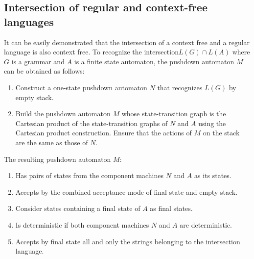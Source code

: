 \subsection{Intersection of regular and context-free languages}
It can be easily demonstrated that the intersection of a context free and a regular language is also context free.
To recognize the intersection$L(G) \cap L(A)$ where $G$ is a grammar and $A$ is a finite state automaton, the pushdown automaton $M$ can be obtained as follows: 
\begin{enumerate}
    \item Construct a one-state pushdown automaton $N$ that recognizes $L (G)$ by empty stack. 
    \item Build the pushdown automaton $M$ whose state-transition graph is the Cartesian product of the state-transition graphs of $N$ and $A$ using the Cartesian product construction.
        Ensure that the actions of $M$ on the stack are the same as those of $N$. 
\end{enumerate}
The resulting pushdown automaton $M$: 
\begin{enumerate}
    \item Has pairs of states from the component machines $N$ and $A$ as its states. 
    \item Accepts by the combined acceptance mode of final state and empty stack.
    \item Consider states containing a final state of $A$ as final states.
    \item Is deterministic if both component machines $N$ and $A$ are deterministic.
    \item Accepts by final state all and only the strings belonging to the intersection language.
\end{enumerate}
